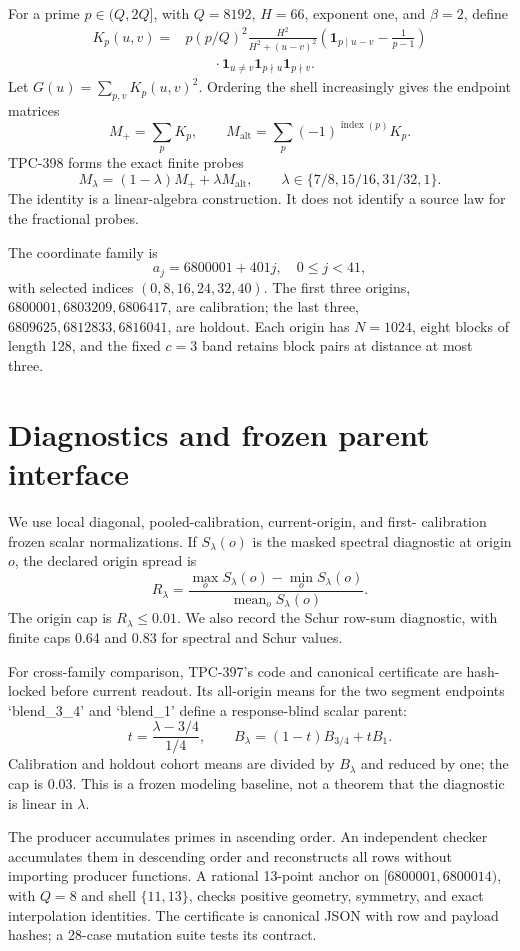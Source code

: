 \documentclass[10pt]{article}
\begin{document}
For a prime \(p\in(Q,2Q]\), with \(Q=8192\), \(H=66\), exponent one, and
\(\beta=2\), define
\begin{align*}
 K_p(u,v)={}&p(p/Q)^2\frac{H^2}{H^2+(u-v)^2}
 \left(\mathbf 1_{p\mid u-v}-\frac{1}{p-1}\right)\\
 &\qquad\cdot\mathbf 1_{u\ne v}\mathbf 1_{p\nmid u}\mathbf 1_{p\nmid v}.
\end{align*}
Let \(G(u)=\sum_{p,v}K_p(u,v)^2\).  Ordering the shell increasingly gives
the endpoint matrices
\[
 M_{+}=\sum_pK_p,\qquad
 M_{\mathrm{alt}}=\sum_p(-1)^{\operatorname{index}(p)}K_p.
\]
TPC-398 forms the exact finite probes
\[
 M_\lambda=(1-\lambda)M_{+}+\lambda M_{\mathrm{alt}},
 \qquad \lambda\in\{7/8,15/16,31/32,1\}.
\]
The identity is a linear-algebra construction.  It does not identify a source
law for the fractional probes.

The coordinate family is
\[
 a_j=6800001+401j,\quad 0\leq j<41,
\]
with selected indices \((0,8,16,24,32,40)\).  The first three origins,
\(6800001,6803209,6806417\), are calibration; the last three,
\(6809625,6812833,6816041\), are holdout.  Each origin has \(N=1024\), eight
blocks of length 128, and the fixed \(c=3\) band retains block pairs at
distance at most three.

\section{Diagnostics and frozen parent interface}

We use local diagonal, pooled-calibration, current-origin, and first-
calibration frozen scalar normalizations.  If \(S_\lambda(o)\) is the masked
spectral diagnostic at origin \(o\), the declared origin spread is
\[
 R_\lambda=\frac{\max_oS_\lambda(o)-\min_oS_\lambda(o)}
 {\operatorname{mean}_oS_\lambda(o)}.
\]
The origin cap is \(R_\lambda\leq0.01\).  We also record the Schur row-sum
diagnostic, with finite caps 0.64 and 0.83 for spectral and Schur values.

For cross-family comparison, TPC-397's code and canonical certificate are
hash-locked before current readout.  Its all-origin means for the two segment
endpoints `blend\_3\_4' and `blend\_1' define a response-blind scalar parent:
\[
 t=\frac{\lambda-3/4}{1/4},\qquad
 B_\lambda=(1-t)B_{3/4}+tB_1.
\]
Calibration and holdout cohort means are divided by \(B_\lambda\) and reduced
by one; the cap is 0.03.  This is a frozen modeling baseline, not a theorem
that the diagnostic is linear in \(\lambda\).

The producer accumulates primes in ascending order.  An independent checker
accumulates them in descending order and reconstructs all rows without
importing producer functions.  A rational 13-point anchor on
\([6800001,6800014)\), with \(Q=8\) and shell \(\{11,13\}\), checks positive
geometry, symmetry, and exact interpolation identities.  The certificate is
canonical JSON with row and payload hashes; a 28-case mutation suite tests its
contract.
\end{document}

